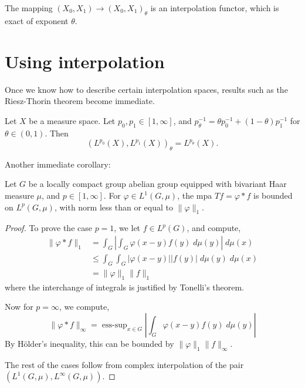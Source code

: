 \begin{proposition}
    The mapping $(X_0,X_1)\rightarrow (X_0,X_1)_\theta$ is an interpolation
    functor, which is exact of exponent $\theta$.
\end{proposition}

\section{Using interpolation}
Once we know how to describe certain interpolation spaces, results
such as the Riesz-Thorin theorem become immediate.
\begin{proposition}
    Let $X$ be a measure space.
    Let $p_0,p_1 \in [1,\infty]$, and $p_\theta^{-1} = \theta p_0^{-1}+(1-\theta)p_1^{-1}$
    for $\theta \in (0,1)$.
    Then
    \begin{equation*}
        (L^{p_0}(X),L^{p_1}(X))_\theta = L^{p_\theta}(X).
    \end{equation*}
\end{proposition}

Another immediate corollary:
\begin{proposition}
    Let $G$ be a locally compact group abelian group equipped
    with bivariant Haar measure $\mu$, and $p \in [1,\infty]$. For $\varphi \in L^1(G,\mu)$, the mpa
    $Tf = \varphi * f$ is bounded on $L^p(G,\mu)$, with norm less than or equal
    to $\|\varphi\|_1$.
\end{proposition}
\begin{proof}
    To prove the case $p = 1$, we let $f \in L^p(G)$, and compute,
    \begin{align*}
        \|\varphi * f\|_1 &= \int_G \left|\int_G\varphi(x-y)f(y)\;d\mu(y)\right|\;d\mu(x)\\
        &\leq \int_G \int_G |\varphi(x-y)||f(y)|\;d\mu(y)\;d\mu(x)\\
        &= \|\varphi\|_1\|f\|_1
    \end{align*}
    where the interchange of integrals is justified by Tonelli's theorem.
    
    Now for $p = \infty$, we compute,
    \begin{equation*}
        \|\varphi*f\|_\infty = \operatorname{ess-sup}_{x \in G} \left|\int_G \varphi(x-y)f(y)\;d\mu(y)\right|
    \end{equation*}
    By H\"older's inequality, this can be bounded by $\|\varphi\|_1\|f\|_\infty$.
    
    The rest of the cases
    follow from complex interpolation of the pair $(L^1(G,\mu),L^\infty(G,\mu))$.
\end{proof} 


